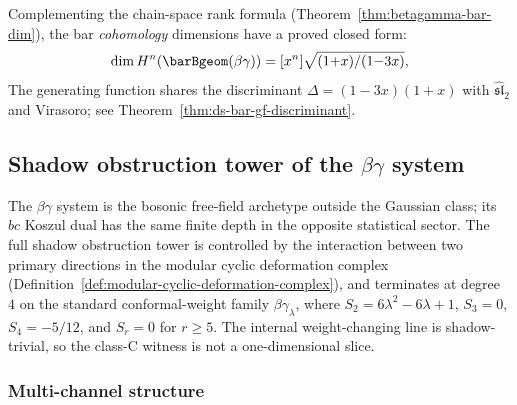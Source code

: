 \begin{remark}\label{rem:betagamma-bar-cohomology-gf}
Complementing the chain-space rank formula (Theorem~\ref{thm:betagamma-bar-dim}),
the bar \emph{cohomology} dimensions have a proved closed form:
\[
\dim H^n(\barBgeom(\beta\gamma))
= [x^n]\sqrt{(1{+}x)/(1{-}3x)},
\]
The generating function shares the discriminant
$\Delta = (1{-}3x)(1{+}x)$
with $\widehat{\mathfrak{sl}}_2$ and Virasoro;
see Theorem~\ref{thm:ds-bar-gf-discriminant}.
\end{remark}

\subsection{\texorpdfstring{Shadow obstruction tower of the $\beta\gamma$ system}{Shadow obstruction tower of the beta-gamma system}}
\label{sec:betagamma-shadow-tower-free}

The $\beta\gamma$ system is the bosonic free-field archetype outside
the Gaussian class; its $bc$ Koszul dual has the same finite depth in
the opposite statistical sector. The full shadow obstruction tower is controlled by the
interaction between two primary directions in the modular cyclic
deformation complex (Definition~\ref{def:modular-cyclic-deformation-complex}),
and terminates at degree~$4$ on the standard conformal-weight family
$\beta\gamma_\lambda$, where
$S_2 = 6\lambda^2 - 6\lambda + 1$, $S_3 = 0$, $S_4 = -5/12$, and
$S_r = 0$ for $r \ge 5$. The internal weight-changing line is
shadow-trivial, so the class-C witness is not a one-dimensional slice.

\subsubsection{Multi-channel structure}
\label{sec:betagamma-multi-channel}

